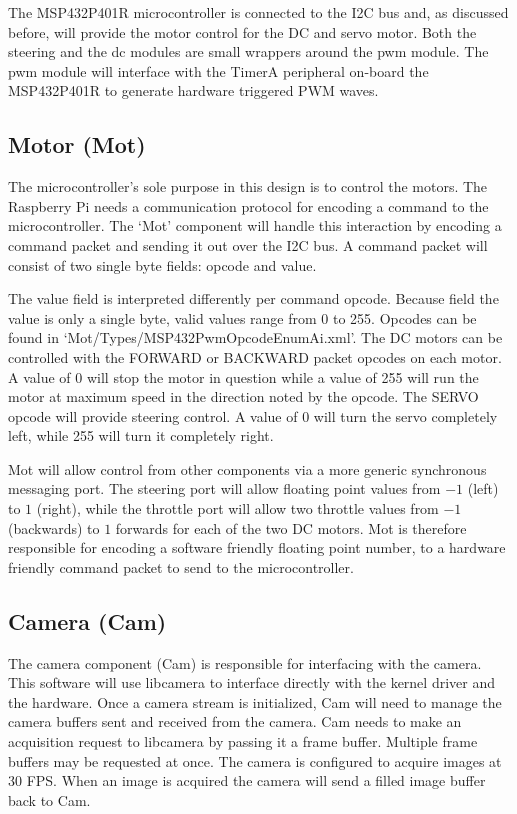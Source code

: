 \documentclass{article}
\begin{document}
The MSP432P401R microcontroller is connected to the I2C bus and, as discussed before,
will provide the motor control for the DC and servo motor. Both the steering and
the dc modules are small wrappers around the pwm module. The pwm module will interface
with the TimerA peripheral on-board the MSP432P401R to generate hardware triggered
PWM waves.

\subsection{Motor (Mot)}

The microcontroller's sole purpose in this design is to control the motors. The
Raspberry Pi needs a communication protocol for encoding a command to the
microcontroller. The `Mot' component will handle this interaction by
encoding a command packet and sending it out over the I2C bus. A command packet
will consist of two single byte fields: opcode and value.

The value field is interpreted differently per command opcode. Because field the
value is only a single byte, valid values range from 0 to 255. Opcodes can be found
in `Mot/Types/MSP432PwmOpcodeEnumAi.xml'. The DC motors can be controlled with
the FORWARD or BACKWARD packet opcodes on each motor. A value of 0 will stop the
motor in question while a value of 255 will run the motor at maximum speed in the
direction noted by the opcode. The SERVO opcode will provide steering control. A
value of 0 will turn the servo completely left, while 255 will turn it completely
right.

Mot will allow control from other components via a more generic synchronous
messaging port. The steering port will allow floating point values from $-1$ (left)
to $1$ (right), while the throttle port will allow two throttle values from $-1$
(backwards) to $1$ forwards for each of the two DC motors. Mot is therefore responsible
for encoding a software friendly floating point number, to a hardware friendly command
packet to send to the microcontroller.

\subsection{Camera (Cam)}

The camera component (Cam) is responsible for interfacing with the camera. This
software will use libcamera to interface directly with the kernel driver and the
hardware. Once a camera stream is initialized, Cam will need to manage the camera
buffers sent and received from the camera. Cam needs to make an acquisition request
to libcamera by passing it a frame buffer. Multiple frame buffers may be requested
at once. The camera is configured to acquire images at 30 FPS. When an image is
acquired the camera will send a filled image buffer back to Cam.
\end{document}
